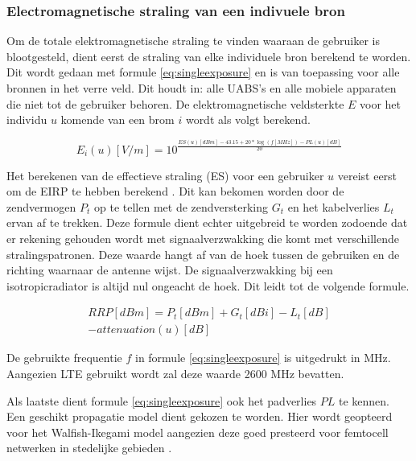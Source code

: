 \documentclass[twocolumn]{phdsymp_dutch}
\begin{document}
\subsubsection{Electromagnetische straling van een indivuele bron}
\label{sec:calculatingexposure}

Om de totale elektromagnetische straling te vinden waaraan de gebruiker is blootgesteld, dient eerst
de straling van elke individuele bron berekend te worden.
Dit wordt gedaan met formule  \ref{eq:singleexposure} en is van toepassing voor alle bronnen in het verre veld.
Dit houdt in: alle  \gls{UABS}'s en alle mobiele apparaten die niet tot de gebruiker behoren.
De elektromagnetische veldsterkte $E$ voor het individu $u$ komende van een brom $i$ wordt als volgt berekend.

\begin{equation}
E_i(u) [V/m] = 10^{\frac{ES(u)[dBm] - 43.15 + 20*\log(f [MHz])- PL(u) [dB]}{20}}
\label{eq:singleexposure}
\end{equation}

Het berekenen van de effectieve straling (ES) voor een gebruiker $u$ vereist eerst om de  \gls{EIRP} te hebben berekend 
 \cite{J6_originalExposureFormula,J1}. Dit kan bekomen worden door de zendvermogen $P_t$ op te tellen met de zendversterking $G_t$
 en het kabelverlies $L_t$ ervan af te trekken.
 Deze formule dient echter uitgebreid te worden zodoende dat er rekening gehouden wordt met signaalverzwakking die komt met
 verschillende stralingspatronen. Deze waarde hangt af van de hoek tussen de gebruiken en de richting waarnaar de antenne wijst. 
 De signaalverzwakking bij een \gls{isotropicradiator} is altijd nul ongeacht de hoek.
 Dit leidt tot de volgende formule.

\begin{equation}
\begin{aligned}
RRP [dBm] = P_t [dBm] + G_t [dBi]- L_t [dB]\\
     - attenuation(u) [dB]
\end{aligned}
\label{eq:eirp}
\end{equation}

De gebruikte frequentie $f$ in formule \ref{eq:singleexposure} is uitgedrukt in MHz. Aangezien 
\gls{LTE} gebruikt wordt zal deze waarde 2600 MHz bevatten.

Als laatste dient formule \ref{eq:singleexposure} ook het padverlies $PL$ te kennen.
Een geschikt propagatie model dient gekozen te worden. Hier wordt geopteerd voor het 
Walfish-Ikegami model aangezien deze goed presteerd voor femtocell netwerken in stedelijke gebieden \cite{J2}.
\end{document}

